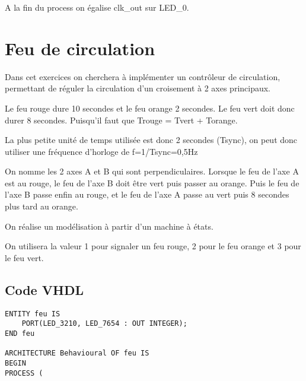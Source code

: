 \documentclass[11pt]{report}
\begin{document}
A la fin du process on égalise clk\_out sur LED\_0.


\section{Feu de circulation}

Dans cet exercices on cherchera à implémenter un contrôleur de circulation, permettant de réguler la circulation d'un croisement à 2 axes principaux. 

Le feu rouge dure 10 secondes et le feu orange 2 secondes. Le feu vert doit donc durer 8 secondes. Puisqu'il faut que Trouge = Tvert + Torange. 

La plus petite unité de temps utilisée est donc 2 secondes (Tsync), on  peut donc utiliser une fréquence d'horloge de f=1/Tsync=0,5Hz

On nomme les 2 axes A et B qui sont perpendiculaires. Lorsque le feu de l'axe A est au rouge, le feu de l'axe B doit être vert puis passer au orange. Puis le feu de l'axe B passe enfin au rouge, et le feu de l'axe A passe au vert puis 8 secondes plus tard au orange. 

On réalise un modélisation à partir d'un machine à états. 

On utilisera la valeur 1 pour signaler un feu rouge, 2 pour le feu orange et 3 pour le feu vert. 

\subsection{Code VHDL}
\begin{lstlisting}
ENTITY feu IS
	PORT(LED_3210, LED_7654 : OUT INTEGER);
END feu

ARCHITECTURE Behavioural OF feu IS
BEGIN 
PROCESS (


\end{lstlisting}
\end{document}

